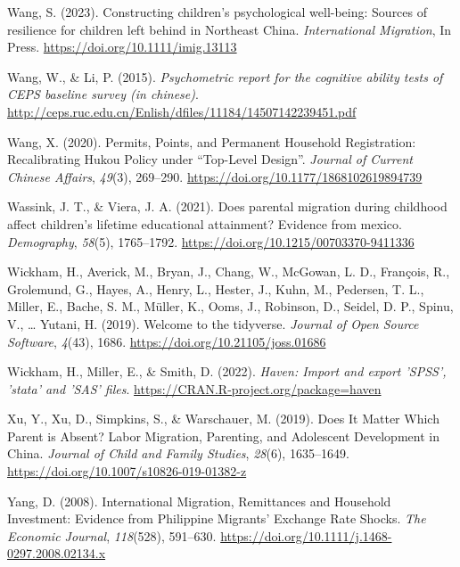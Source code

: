 \documentclass[
  man,floatsintext]{apa7}
\newlength{\cslhangindent}
\newlength{\cslentryspacingunit} %
\newenvironment{CSLReferences}[2] %
 {%
  \setlength{\parindent}{0pt}
  \ifodd #1
  \let\oldpar\par
  \def\par{\hangindent=\cslhangindent\oldpar}
  \fi
  \setlength{\parskip}{#2\cslentryspacingunit}
 }%
 {}
\begin{document}
\begin{CSLReferences}{1}{0}
\leavevmode{}%
Wang, S. (2023). Constructing children's psychological well-being: Sources of resilience for children left behind in Northeast China. \emph{International Migration}, In Press. \url{https://doi.org/10.1111/imig.13113}

\leavevmode{}%
Wang, W., \& Li, P. (2015). \emph{Psychometric report for the cognitive ability tests of CEPS baseline survey (in chinese)}. \url{http://ceps.ruc.edu.cn/Enlish/dfiles/11184/14507142239451.pdf}

\leavevmode{}%
Wang, X. (2020). Permits, Points, and Permanent Household Registration: Recalibrating Hukou Policy under {``}Top-Level Design{''}. \emph{Journal of Current Chinese Affairs}, \emph{49}(3), 269--290. \url{https://doi.org/10.1177/1868102619894739}

\leavevmode{}%
Wassink, J. T., \& Viera, J. A. (2021). Does parental migration during childhood affect children's lifetime educational attainment? Evidence from mexico. \emph{Demography}, \emph{58}(5), 1765--1792. \url{https://doi.org/10.1215/00703370-9411336}

\leavevmode{}%
Wickham, H., Averick, M., Bryan, J., Chang, W., McGowan, L. D., François, R., Grolemund, G., Hayes, A., Henry, L., Hester, J., Kuhn, M., Pedersen, T. L., Miller, E., Bache, S. M., Müller, K., Ooms, J., Robinson, D., Seidel, D. P., Spinu, V., \ldots{} Yutani, H. (2019). Welcome to the {tidyverse}. \emph{Journal of Open Source Software}, \emph{4}(43), 1686. \url{https://doi.org/10.21105/joss.01686}

\leavevmode{}%
Wickham, H., Miller, E., \& Smith, D. (2022). \emph{Haven: Import and export 'SPSS', 'stata' and 'SAS' files}. \url{https://CRAN.R-project.org/package=haven}

\leavevmode{}%
Xu, Y., Xu, D., Simpkins, S., \& Warschauer, M. (2019). Does It Matter Which Parent is Absent? Labor Migration, Parenting, and Adolescent Development in China. \emph{Journal of Child and Family Studies}, \emph{28}(6), 1635--1649. \url{https://doi.org/10.1007/s10826-019-01382-z}

\leavevmode{}%
Yang, D. (2008). International Migration, Remittances and Household Investment: Evidence from Philippine Migrants{'} Exchange Rate Shocks. \emph{The Economic Journal}, \emph{118}(528), 591--630. \url{https://doi.org/10.1111/j.1468-0297.2008.02134.x}


\end{CSLReferences}
\end{document}
